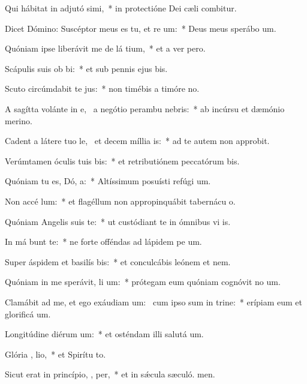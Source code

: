 \item Qui hábitat in adjutó simi,~* in protectióne Dei cæli combitur.
\item Dicet Dómino: Suscéptor meus es tu, et re um:~* Deus meus sperábo  um.
\item Quóniam ipse liberávit me de lá tium,~* et a ver pero.
\item Scápulis suis ob bi:~* et sub pennis ejus bis.
\item Scuto circúmdabit te  jus:~* non timébis a timóre no.
\item A sagítta volánte in e,~\pscross{} a negótio perambu  nebris:~* ab incúrsu et dæmónio merino.
\item Cadent a látere tuo le,~\pscross{} et decem míllia   is:~* ad te autem non approbit.
\item Verúmtamen óculis tuis bis:~* et retributiónem peccatórum bis.
\item Quóniam tu es, Dó,  a:~* Altíssimum posuísti refúgi um.
\item Non accé   lum:~* et flagéllum non appropinquábit tabernácu o.
\item Quóniam Angelis suis   te:~* ut custódiant te in ómnibus vi is.
\item In má bunt te:~* ne forte offéndas ad lápidem pe um.
\item Super áspidem et basilís bis:~* et conculcábis leónem et nem.
\item Quóniam in me sperávit, li um:~* prótegam eum quóniam cognóvit no um.
\item Clamábit ad me, et ego exáudiam um:~\pscross{} cum ipso sum in trine:~* erípiam eum et glorificá um.
\item Longitúdine diérum  um:~* et osténdam illi salutá um.
\item Glória ,  lio,~* et Spirítu to.
\item Sicut erat in princípio,  ,  per,~* et in sǽcula sæculó. men.
